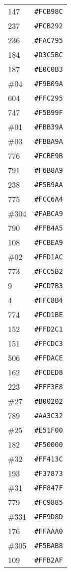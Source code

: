 \documentclass[a4paper]{article}
\begin{document}
\begin{longtable}{|l|r|}
147 & \texttt{\#FCB98C} \\
237 & \texttt{\#FCB292} \\
236 & \texttt{\#FAC795} \\
184 & \texttt{\#D3C5BC} \\
187 & \texttt{\#E0C0B3} \\
\#04 & \texttt{\#F9B09A} \\
604 & \texttt{\#FFC295} \\
747 & \texttt{\#F5B99F} \\
\#01 & \texttt{\#FBB39A} \\
\#03 & \texttt{\#FBBA9A} \\
776 & \texttt{\#FCBE9B} \\
791 & \texttt{\#F6B8A9} \\
238 & \texttt{\#F5B9AA} \\
775 & \texttt{\#FCC6A4} \\
\#304 & \texttt{\#FABCA9} \\
790 & \texttt{\#FFB4A5} \\
108 & \texttt{\#FCBEA9} \\
\#02 & \texttt{\#FFD1AC} \\
773 & \texttt{\#FCC5B2} \\
9 & \texttt{\#FCD7B3} \\
4 & \texttt{\#FFC8B4} \\
774 & \texttt{\#FCD1BE} \\
152 & \texttt{\#FFD2C1} \\
151 & \texttt{\#FFCDC3} \\
506 & \texttt{\#FFDACE} \\
162 & \texttt{\#FCDED8} \\
223 & \texttt{\#FFF3E8} \\
\#27 & \texttt{\#B00202} \\
789 & \texttt{\#AA3C32} \\
\#25 & \texttt{\#E51F00} \\
182 & \texttt{\#F50000} \\
\#32 & \texttt{\#FF413C} \\
193 & \texttt{\#F37873} \\
\#31 & \texttt{\#FF847F} \\
779 & \texttt{\#FC9885} \\
\#331 & \texttt{\#FF9D8D} \\
176 & \texttt{\#FFAAA0} \\
\#305 & \texttt{\#F5BAB8} \\
109 & \texttt{\#FFB2AF} \\

\end{longtable}
\end{document}
